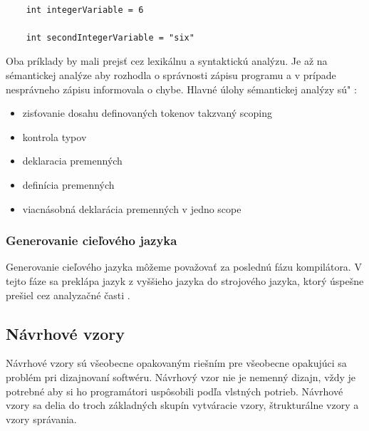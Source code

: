 \begin{lstlisting}

	int integerVariable = 6

	int secondIntegerVariable = "six"
\end{lstlisting}

Oba príklady by mali prejsť cez lexikálnu a syntaktickú analýzu. Je až na sémantickej analýze aby rozhodla o správnosti zápisu programu a v prípade nesprávneho zápisu informovala o chybe.  Hlavné úlohy sémantickej analýzy sú" :

\begin{itemize}
	\item zisťovanie dosahu definovaných tokenov takzvaný scoping
	\item kontrola typov
	\item deklaracia premenných
	\item definícia premenných
	\item viacnásobná deklarácia premenných v jedno scope
\end{itemize}

\subsubsection{Generovanie cieľového jazyka}
\indent Generovanie cieľového jazyka môžeme považovať za poslednú fázu kompilátora. V tejto fáze sa preklápa jazyk z vyššieho jazyka do strojového jazyka, ktorý úspešne prešiel cez analyzačné časti .\cite{gram}

\subsection{Návrhové vzory}
\indent Návrhové vzory sú všeobecne opakovaným riešním pre všeobecne opakujúci sa problém pri dizajnovaní softwéru. Návrhový vzor nie je nemenný dizajn, vždy je potrebné aby si ho programátori uspôsobili podľa vlstných potrieb. Návrhové vzory sa delia do troch základných skupín vytváracie vzory, štrukturálne vzory a vzory správania. 

